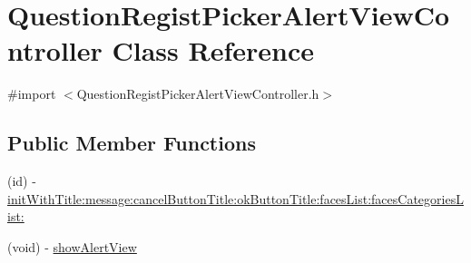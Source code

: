 \hypertarget{interface_question_regist_picker_alert_view_controller}{
\section{QuestionRegistPickerAlertViewController Class Reference}
\label{interface_question_regist_picker_alert_view_controller}
}


{\ttfamily \#import $<$QuestionRegistPickerAlertViewController.h$>$}

\subsection*{Public Member Functions}
\begin{DoxyCompactItemize}
\item 
(id) -\/ \hyperlink{interface_question_regist_picker_alert_view_controller_a003a9b00d552e4c544770ab7418fc280}{initWithTitle:message:cancelButtonTitle:okButtonTitle:facesList:facesCategoriesList:}
\item 
(void) -\/ \hyperlink{interface_question_regist_picker_alert_view_controller_a5f345ef74578eb28348f1e4cd1a8ba8e}{showAlertView}
\end{DoxyCompactItemize}
